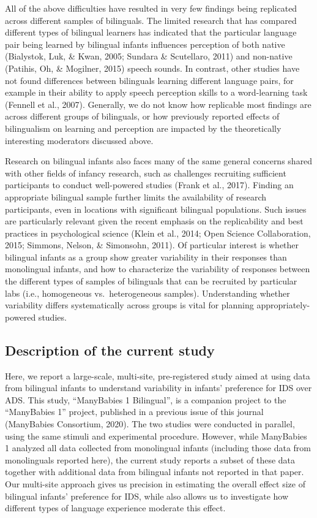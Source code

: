 \documentclass[
  english,
  ,man,floatsintext]{apa6}
\begin{document}
All of the above difficulties have resulted in very few findings being replicated across different samples of bilinguals. The limited research that has compared different types of bilingual learners has indicated that the particular language pair being learned by bilingual infants influences perception of both native (Bialystok, Luk, \& Kwan, 2005; Sundara \& Scutellaro, 2011) and non-native (Patihis, Oh, \& Mogilner, 2015) speech sounds. In contrast, other studies have not found differences between bilinguals learning different language pairs, for example in their ability to apply speech perception skills to a word-learning task (Fennell et al., 2007). Generally, we do not know how replicable most findings are across different groups of bilinguals, or how previously reported effects of bilingualism on learning and perception are impacted by the theoretically interesting moderators discussed above.

Research on bilingual infants also faces many of the same general concerns shared with other fields of infancy research, such as challenges recruiting sufficient participants to conduct well-powered studies (Frank et al., 2017). Finding an appropriate bilingual sample further limits the availability of research participants, even in locations with significant bilingual populations. Such issues are particularly relevant given the recent emphasis on the replicability and best practices in psychological science (Klein et al., 2014; Open Science Collaboration, 2015; Simmons, Nelson, \& Simonsohn, 2011). Of particular interest is whether bilingual infants as a group show greater variability in their responses than monolingual infants, and how to characterize the variability of responses between the different types of samples of bilinguals that can be recruited by particular labs (i.e., homogeneous vs.~heterogeneous samples). Understanding whether variability differs systematically across groups is vital for planning appropriately-powered studies.

\hypertarget{description-of-the-current-study}{%
\subsection{Description of the current study}\label{description-of-the-current-study}}

Here, we report a large-scale, multi-site, pre-registered study aimed at using data from bilingual infants to understand variability in infants' preference for IDS over ADS. This study, \enquote{ManyBabies 1 Bilingual}, is a companion project to the \enquote{ManyBabies 1} project, published in a previous issue of this journal (ManyBabies Consortium, 2020). The two studies were conducted in parallel, using the same stimuli and experimental procedure. However, while ManyBabies 1 analyzed all data collected from monolingual infants (including those data from monolinguals reported here), the current study reports a subset of these data together with additional data from bilingual infants not reported in that paper. Our multi-site approach gives us precision in estimating the overall effect size of bilingual infants' preference for IDS, while also allows us to investigate how different types of language experience moderate this effect.
\end{document}
